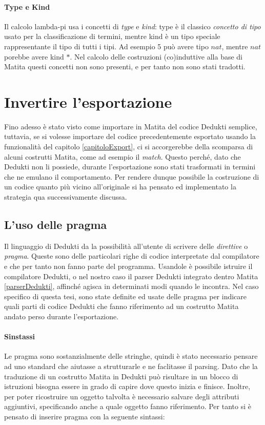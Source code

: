 \documentclass[12pt,a4paper]{report}
\begin{document}
\paragraph{Type e Kind}
Il calcolo lambda-pi usa i concetti di \textit{type} e \textit{kind}: type è
il classico \textit{concetto di tipo} usato per la classificazione di termini,
mentre kind è un tipo speciale rappresentante il tipo di tutti i tipi. Ad 
esempio 5 può avere tipo $nat$, mentre $nat$ porebbe avere kind $*$. Nel 
calcolo delle costruzioni (co)induttive alla base di Matita questi concetti
non sono presenti, e per tanto non sono stati tradotti. %

\section{Invertire l'esportazione}
Fino adesso è stato visto come importare in Matita del codice Dedukti semplice,
tuttavia, se si volesse importare del codice precedentemente esportato usando
la funzionalità del capitolo \ref{capitoloExport}, ci si accorgerebbe della 
scomparsa di alcuni costrutti Matita, come ad esempio il \textit{match}. Questo
perché, dato che Dedukti non li possiede, durante l'esportazione sono stati
trasformati in termini che ne emulano il comportamento. Per rendere dunque possibile
la costruzione di un codice quanto più vicino all'originale si ha pensato ed 
implementato la strategia qua successivamente discussa.

\subsection{L'uso delle pragma}
Il linguaggio di Dedukti da la possibilità all'utente di scrivere delle 
\textit{direttive} o \textit{pragma}. Queste sono delle particolari righe di
codice interpretate dal compilatore e che per tanto non fanno parte del programma.
Usandole è possibile istruire il compilatore Dedukti, o nel nostro caso il parser
Dedukti integrato dentro Matita \ref{parserDedukti}, affinché agisca in determinati
modi quando le incontra. 
Nel caso specifico di questa tesi, sono state definite ed usate delle pragma
per indicare quali parti di codice Dedukti che fanno riferimento ad un costrutto 
Matita andato perso durante l'esportazione.

\paragraph{Sinstassi} Le pragma sono sostanzialmente delle stringhe, quindi
è stato necessario pensare ad uno standard che aiutasse a strutturarle e 
ne faclitasse il parsing. Dato che la traduzione di un costrutto Matita in 
Dedukti può risultare in un blocco di istruzioni bisogna essere in grado di
capire dove questo inizia e finisce. Inoltre, per poter ricostruire un oggetto
talvolta è necessario salvare degli attributi aggiuntivi, specificando anche
a quale oggetto fanno riferimento. Per tanto si è pensato di inserire pragma
con la seguente sintassi:
\end{document}
